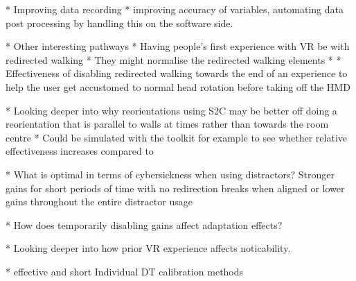 * Improving data recording
   * improving accuracy of variables, automating data post processing by handling this on the software side. 

* Other interesting pathways
   * Having people's first experience with VR be with redirected walking
      * They might normalise the redirected walking elements
         * 
   * Effectiveness of disabling redirected walking towards the end of an experience to help the user get accustomed to normal head rotation before taking off the HMD
   
   * Looking deeper into why reorientations using S2C may be better off doing a reorientation that is parallel to walls at times rather than towards the room centre
      * Could be simulated with the toolkit for example to see whether relative effectiveness increases compared to 
      
   * What is optimal in terms of cybersickness when using distractors? Stronger gains for short periods of time with no redirection breaks when aligned or lower gains throughout the entire distractor usage
   
   * How does temporarily disabling gains affect adaptation effects?
   
   * Looking deeper into how prior VR experience affects noticability. 
   
   * effective and short Individual DT calibration methods